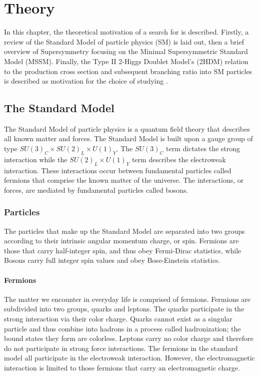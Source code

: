 \chapter{Theory}\label{sec:Theory}
    In this chapter, the theoretical motivation of a search for \HpmLong is described. Firstly, a review of the Standard Model of particle physics (SM) is laid out, then a brief overview of Supersymmetry focusing on the Minimal Supersymmetric Standard Model (MSSM). Finally, the Type II 2-Higgs Doublet Model's (2HDM) relation to the \Hpm production cross section and subsequent branching ratio into SM particles is described as motivation for the choice of studying \HpmLong.

\section{The Standard Model}\label{sec:SM}
	 The Standard Model of particle physics is a quantum field theory that describes all known matter and forces. The Standard Model is built upon a gauge group of type $SU(3)_C \times SU(2)_L \times U(1)_Y$. The $SU(3)_C$ term dictates the strong interaction while the $SU(2)_L \times U(1)_Y$ term describes the electroweak interaction. These interactions occur between fundamental particles called fermions that comprise the known matter of the universe. The interactions, or forces, are mediated by fundamental particles called bosons. 

	\subsection{Particles}\label{ssec:Particles}
		The particles that make up the Standard Model are separated into two groups according to their intrinsic angular momentum charge, or spin. Fermions are those that carry half-integer spin, and thus obey Fermi-Dirac statistics, while Bosons carry full integer spin values and obey Bose-Einstein statistics.
		
		\subsubsection{Fermions}\label{sssec:Fermions}
			The matter we encounter in everyday life is comprised of fermions. Fermions are subdivided into two groups, quarks and leptons. The quarks participate in the strong interaction via their color charge. Quarks cannot exist as a singular particle and thus combine into hadrons in a process called hadronization; the bound states they form are colorless. Leptons carry no color charge and therefore do not participate in strong force interactions. The fermions in the standard model all participate in the electroweak interaction. However, the electromagnetic interaction is limited to those fermions that carry an electromagnetic charge.

